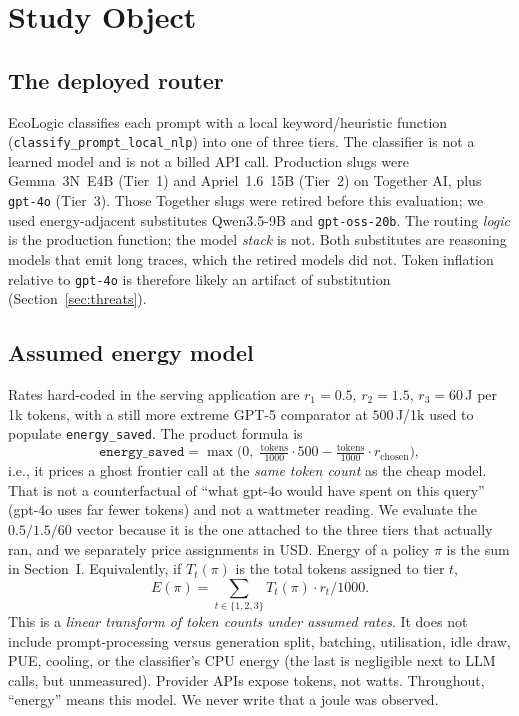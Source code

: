 \documentclass[10pt,conference]{IEEEtran}
\begin{document}
\section{Study Object}

\subsection{The deployed router}

EcoLogic classifies each prompt with a local keyword/heuristic function (\texttt{classify\_prompt\_local\_nlp}) into one of three tiers. The classifier is not a learned model and is not a billed API call. Production slugs were Gemma~3N~E4B (Tier~1) and Apriel~1.6~15B (Tier~2) on Together AI, plus \texttt{gpt-4o} (Tier~3). Those Together slugs were retired before this evaluation; we used energy-adjacent substitutes Qwen3.5-9B and \texttt{gpt-oss-20b}. The routing \emph{logic} is the production function; the model \emph{stack} is not. Both substitutes are reasoning models that emit long traces, which the retired models did not. Token inflation relative to \texttt{gpt-4o} is therefore likely an artifact of substitution (Section~\ref{sec:threats}).

\subsection{Assumed energy model}

Rates hard-coded in the serving application are $r_1=0.5$, $r_2=1.5$, $r_3=60$\,J per 1k tokens, with a still more extreme GPT-5 comparator at $500$\,J/1k used to populate \texttt{energy\_saved}. The product formula is
\[
\texttt{energy\_saved}=\max\bigl(0,\; \tfrac{\mathrm{tokens}}{1000}\cdot 500 - \tfrac{\mathrm{tokens}}{1000}\cdot r_{\mathrm{chosen}}\bigr),
\]
i.e., it prices a ghost frontier call at the \emph{same token count} as the cheap model. That is not a counterfactual of ``what gpt-4o would have spent on this query'' (gpt-4o uses far fewer tokens) and not a wattmeter reading. We evaluate the $0.5/1.5/60$ vector because it is the one attached to the three tiers that actually ran, and we separately price assignments in USD. Energy of a policy $\pi$ is the sum in Section~I. Equivalently, if $T_t(\pi)$ is the total tokens assigned to tier $t$,
\[
E(\pi)=\sum_{t\in\{1,2,3\}} T_t(\pi)\cdot r_t/1000.
\]
This is a \emph{linear transform of token counts under assumed rates}. It does not include prompt-processing versus generation split, batching, utilisation, idle draw, PUE, cooling, or the classifier's CPU energy (the last is negligible next to LLM calls, but unmeasured). Provider APIs expose tokens, not watts. Throughout, ``energy'' means this model. We never write that a joule was observed.
\end{document}
